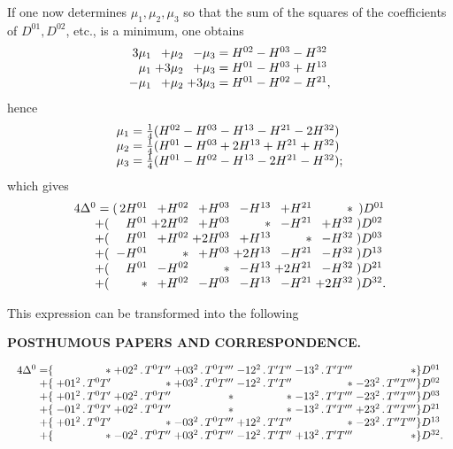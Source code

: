 If one now determines \(\mu_1,\mu_2,\mu_3\) so that the sum of the squares of the coefficients of \(D^{01},D^{02}\), etc., is a minimum, one obtains
\[
\begin{array}{@{}r@{\;}r@{\;}r@{\;=\;}l@{}}
 3\mu_1&+\mu_2&-\mu_3&H^{02}-H^{03}-H^{32}\\
 \mu_1&+3\mu_2&+\mu_3&H^{01}-H^{03}+H^{13}\\
 -\mu_1&+\mu_2&+3\mu_3&H^{01}-H^{02}-H^{21},
\end{array}
\]
\noindent hence
\[
\begin{array}{@{}r@{\;=\;}l@{}}
 \mu_1&\tfrac14(H^{02}-H^{03}-H^{13}-H^{21}-2H^{32})\\
 \mu_2&\tfrac14(H^{01}-H^{03}+2H^{13}+H^{21}+H^{32})\\
 \mu_3&\tfrac14(H^{01}-H^{02}-H^{13}-2H^{21}-H^{32});
\end{array}
\]
\noindent which gives
\[
\begin{array}{@{}r@{\;}r@{\;}r@{\;}r@{\;}r@{\;}r@{\;}r@{\;}l@{}}
 4\Delta^0=&(\,2H^{01}&+H^{02}&+H^{03}&-H^{13}&+H^{21}&\ast&\,)D^{01}\\
 +(&H^{01}&+2H^{02}&+H^{03}&\ast&-H^{21}&+H^{32}&)D^{02}\\
 +(&H^{01}&+H^{02}&+2H^{03}&+H^{13}&\ast&-H^{32}&)D^{03}\\
 +(&-H^{01}&\ast&+H^{03}&+2H^{13}&-H^{21}&-H^{32}&)D^{13}\\
 +(&H^{01}&-H^{02}&\ast&-H^{13}&+2H^{21}&-H^{32}&)D^{21}\\
 +(&\ast&+H^{02}&-H^{03}&-H^{13}&-H^{21}&+2H^{32}&)D^{32}.
\end{array}
\]

This expression can be transformed into the following

\par\clearpage
\noindent{}\hfill{\small\textbf{POSTHUMOUS PAPERS AND CORRESPONDENCE.}}\hfill\null\par\medskip

\[
\resizebox{\linewidth}{!}{\(\begin{array}{@{}r@{}r@{\;}r@{\;}r@{\;}r@{\;}r@{\;}r@{\;}r@{}l@{}}
 4\Delta^0=&\{&\ast&+02^2\,.\,T^0T''&+03^2\,.\,T^0T'''&-12^2\,.\,T'T''&-13^2\,.\,T'T'''&\ast&\}D^{01}\\
 +&\{&+01^2\,.\,T^0T'&\ast&+03^2\,.\,T^0T'''&-12^2\,.\,T'T''&\ast&-23^2\,.\,T''T'''&\}D^{02}\\
 +&\{&+01^2\,.\,T^0T'&+02^2\,.\,T^0T''&\ast&\ast&-13^2\,.\,T'T'''&-23^2\,.\,T''T'''&\}D^{03}\\
 +&\{&-01^2\,.\,T^0T'&+02^2\,.\,T^0T''&\ast&\ast&-13^2\,.\,T'T'''&+23^2\,.\,T''T'''&\}D^{21}\\
 +&\{&+01^2\,.\,T^0T'&\ast&-03^2\,.\,T^0T'''&+12^2\,.\,T'T''&\ast&-23^2\,.\,T''T'''&\}D^{13}\\
 +&\{&\ast&-02^2\,.\,T^0T''&+03^2\,.\,T^0T'''&-12^2\,.\,T'T''&+13^2\,.\,T'T'''&\ast&\}D^{32}.
\end{array}\)}
\]

